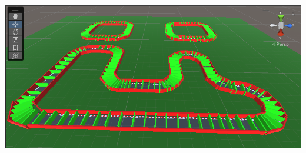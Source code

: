 \documentclass[12pt]{article}
\begin{document}
\vspace{0.5cm}
\begin{center}
    \centering 
    \includegraphics[height=11cm, width=15cm]{images/allTracksWalls}
\end{center}


\newpage
\end{document}
